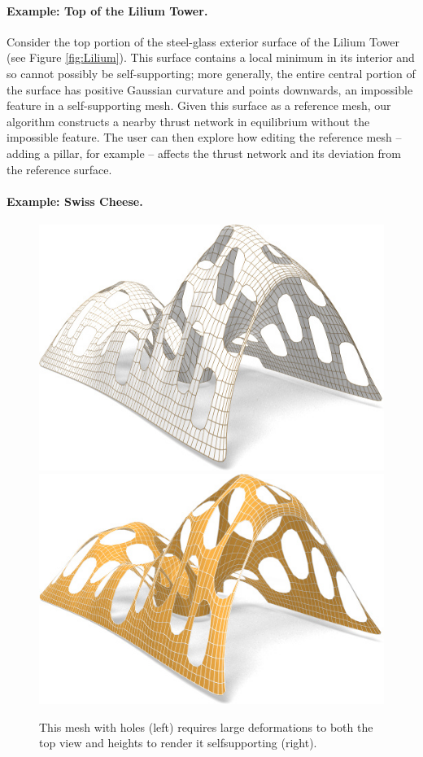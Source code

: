 \documentclass[annual]{acmsiggraph}
\begin{document}
\paragraph{Example: Top of the Lilium Tower.}

Consider the top portion of the steel-glass exterior surface of the Lilium 
Tower (see Figure \ref{fig:Lilium}). This surface contains a local minimum 
in its interior and so cannot possibly be self-supporting; more generally, 
the entire central portion of the surface has positive Gaussian curvature 
and points downwards, an impossible feature in a self-supporting mesh. 
Given this surface as a reference mesh, our algorithm constructs a nearby 
thrust network in equilibrium without the impossible feature. The user can 
then explore how editing the reference mesh -- adding a pillar, for 
example -- affects the thrust network and its deviation from the reference 
surface.

\paragraph{Example: Swiss Cheese.}

  \begin{figure}[htb]
  \centerline{\includegraphics[width=0.5\columnwidth]{fig/cheese.jpg}\hfill
  \includegraphics[width=0.5\columnwidth]{fig/cheese-n.jpg}}
  \caption{This mesh with holes (left) requires large deformations
to both the top view and heights to render it self\dash supporting
(right).}
 	\label{fig:cheese2}
  \end{figure}
\end{document}
